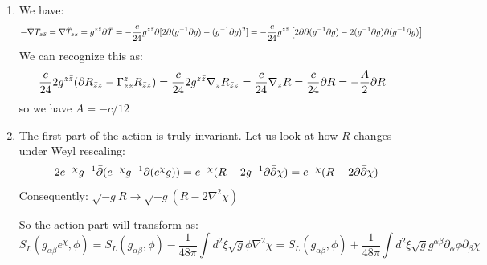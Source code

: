 \documentclass[11pt]{article}
\begin{document}
\begin{enumerate}
	\item We have:
	\[
		- \bar \nabla T_{z \bar z} = \nabla \hat T_{zz} = g^{z \bar z} \bar \partial \hat T = - \frac{c}{24} g^{z \bar z} \bar {\partial} [2 \partial(g^{-1} \partial g) - (g^{-1} \partial g)^2] = -\frac{c}{24} g^{z \bar z} \left[2\partial \bar {\partial}(g^{-1} \partial g) - 2 (g^{-1} \partial g) \bar {\partial} (g^{-1} \partial g)\right]
	\]
	We can recognize this as:
	\[
		\frac{c}{24} 2 g^{z \bar z} (\partial R_{\bar z z} - \Gamma^z_{z z} R_{\bar z z}) = \frac{c}{24} 2 g^{z \bar z} \nabla_z R_{\bar z z} = \frac{c}{24} \nabla_z R = \frac{c}{24} \partial R  = - \frac{A}{2} \partial R
	\]
	so we have $A = - c/12$
	\item The first part of the action is truly invariant. Let us look at how $R$ changes under Weyl rescaling:
	\[
		-2 e^{-\chi} g^{-1} \bar {\partial}(e^{-\chi} g^{-1} \partial (e^{\chi} g)) = e^{-\chi} (R - 2 g^{-1} \partial \bar \partial \chi) = e^{-\chi} (R - 2 \partial \bar \partial \chi)
	\]
	Consequently: $\sqrt{-g} R \to \sqrt{-g} (R - 2 \nabla^2 \chi)$
	
	So the action part will transform as:
	\[
		S_L(g_{\alpha \beta} e^{\chi}, \phi) = S_L(g_{\alpha \beta}, \phi) - \frac{1}{48\pi} \int d^2 \xi \sqrt{g} \phi \nabla^2 \chi = S_L(g_{\alpha \beta}, \phi) + \frac{1}{48\pi} \int d^2 \xi \sqrt{g} g^{\alpha \beta} \partial_{\alpha} \phi \partial_\beta \chi
	\]
	

\end{enumerate}
\end{document}

